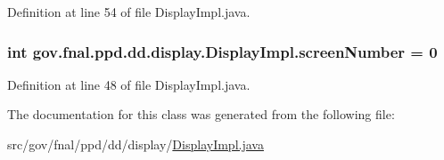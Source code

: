 Definition at line 54 of file Display\-Impl.\-java.

\hypertarget{classgov_1_1fnal_1_1ppd_1_1dd_1_1display_1_1DisplayImpl_ace620614bde13cee492129c27f38db4e}{
\subsubsection[{screen\-Number}]{\setlength{\rightskip}{0pt plus 5cm}int gov.\-fnal.\-ppd.\-dd.\-display.\-Display\-Impl.\-screen\-Number = 0\hspace{0.3cm}{\ttfamily [protected]}}}\label{classgov_1_1fnal_1_1ppd_1_1dd_1_1display_1_1DisplayImpl_ace620614bde13cee492129c27f38db4e}


Definition at line 48 of file Display\-Impl.\-java.



The documentation for this class was generated from the following file\-:\begin{DoxyCompactItemize}
\item 
src/gov/fnal/ppd/dd/display/\hyperlink{DisplayImpl_8java}{Display\-Impl.\-java}\end{DoxyCompactItemize}
